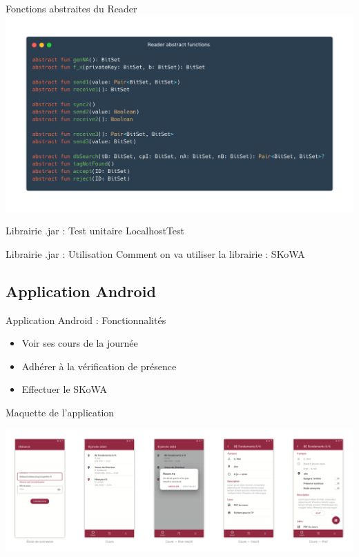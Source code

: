 \documentclass[aspectratio=169]{beamer}
\begin{document}
\begin{frame}{Fonctions abstraites du Reader}
    \centering
    \includegraphics[width=.95\linewidth]{../assets/readerAbs}
\end{frame}

\begin{frame}{Librairie .jar : Test unitaire}
    LocalhostTest
\end{frame}

\begin{frame}{Librairie .jar : Utilisation}
    Comment on va utiliser la librairie : SKoWA
\end{frame}

\subsection{Application Android}

\begin{frame}{Application Android : Fonctionnalités}

    \begin{itemize}
        \item Voir ses cours de la journée
        \item Adhérer à la vérification de présence
        \item Effectuer le SKoWA
    \end{itemize}

\end{frame}

\begin{frame}{Maquette de l'application}
    \begin{adjustwidth}{-1.8em}{2em}
        \centering
        \includegraphics[width=1.1\linewidth]{../assets/maquette.png}
    \end{adjustwidth}
\end{frame}
\end{document}
